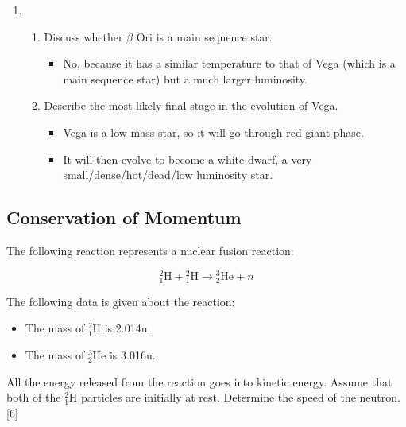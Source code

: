 \documentclass[a4paper,12pt]{article}
\newcommand{\atom}[3]{{}^{#1}_{#2}\text{#3}}
\begin{document}
\begin{enumerate}[label=(\alph*)]
  \item
        \begin{enumerate}[label=(\roman*)]
          \item Discuss whether $\beta$ Ori is a main sequence star.
                \begin{itemize}
                  \item No, because it has a similar temperature to that of Vega (which is a main sequence star) but a much larger luminosity.
                \end{itemize}
          \item Describe the most likely final stage in the evolution of Vega.
                \begin{itemize}
                  \item Vega is a low mass star, so it will go through red giant phase.
                  \item It will then evolve to become a white dwarf, a very small/dense/hot/dead/low luminosity star.

                \end{itemize}
        \end{enumerate}

\end{enumerate}

\pagebreak

\subsection{Conservation of Momentum}

The following reaction represents a nuclear fusion reaction:

$$\atom{2}{1}{H} + \atom{2}{1}{H} \rightarrow \atom{3}{2}{He} +  n$$

The following data is given about the reaction:
\begin{itemize}
  \item The mass of $\atom{2}{1}{H}$ is 2.014u.
  \item The mass of $\atom{3}{2}{He}$ is 3.016u.
\end{itemize}

All the energy released from the reaction goes into kinetic energy. Assume that both of the $\atom{2}{1}{H}$ particles are initially at rest. Determine the speed of the neutron. \hfill [6]
\end{document}
